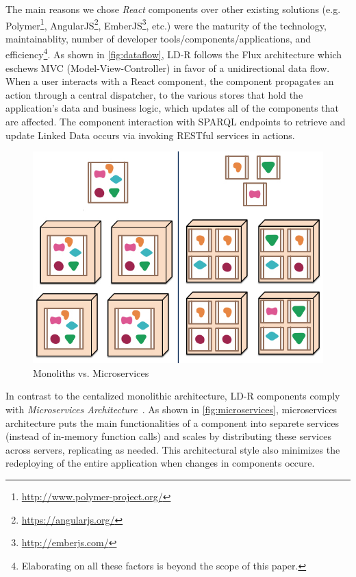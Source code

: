\documentclass{acm_proc_article-sp}
\begin{document}
The main reasons we chose \emph{React} components over other existing solutions (e.g. Polymer\footnote{\url{http://www.polymer-project.org/}}, AngularJS\footnote{\url{https://angularjs.org/}}, EmberJS\footnote{\url{http://emberjs.com/}}, etc.) were the maturity of the technology, maintainablity, number of developer tools/components/applications, and efficiency\footnote{Elaborating on all these factors is beyond the scope of this paper.}.
As shown in \autoref{fig:dataflow}, LD-R follows the Flux architecture which eschews MVC (Model-View-Controller) in favor of a unidirectional data flow. 
When a user interacts with a React component, the component propagates an action through a central dispatcher, to the various stores that hold the application's data and business logic, which updates all of the components that are affected. 
The component interaction with SPARQL endpoints to retrieve and update Linked Data occurs via invoking RESTful services in actions.

\begin{figure}[tb]
  \includegraphics[width=.9\linewidth]{images/microservices.jpg}
  \caption{Monoliths vs. Microservices~\cite{microservices}}
  \label{fig:microservices}
\end{figure}

In contrast to the centalized monolithic architecture, LD-R components comply with \emph{Microservices Architecture}~\cite{microservices}.
As shown in \autoref{fig:microservices}, microservices architecture puts the main functionalities of a component into separete services (instead of in-memory function calls) and scales by distributing these services across servers, replicating as needed.
This architectural style also minimizes the redeploying of the entire application when changes in components occure.
\end{document}
